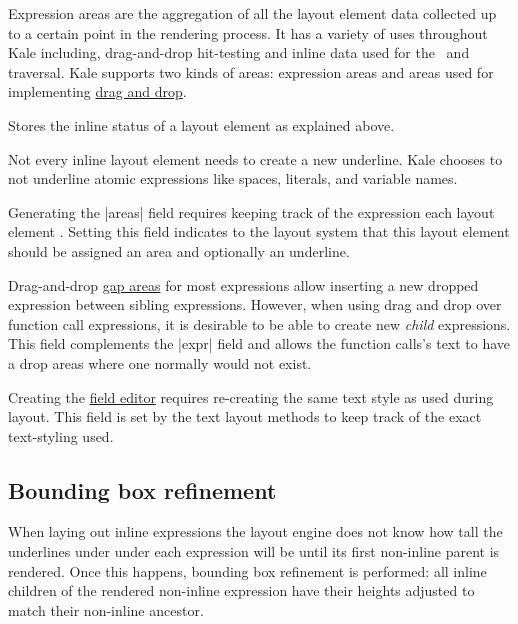  Expression areas are the aggregation of all the layout element
data collected up to a certain point in the rendering process. It has a
variety of uses throughout Kale including, drag-and-drop hit-testing and inline
data used for the~\ak{^} and~ traversal. Kale supports two kinds of
areas: expression areas and  areas used for implementing
\hyperref[impl:dnd]{drag and drop}.

 Stores the inline status of a layout element as explained
above.

 Not every inline layout element needs to create
a new underline. Kale
chooses to not underline atomic expressions like spaces, literals, and variable
names.

 Generating the |areas| field requires keeping track of the
expression each layout element . Setting this field indicates
to the layout system that this layout element should be assigned an area and
optionally an underline.

 Drag-and-drop \hyperref[layout:areas]{gap areas} for most
expressions allow inserting a new dropped expression between sibling
expressions. However, when using drag and drop over function call expressions,
it is desirable to be able to create new \emph{child} expressions. This field
complements the |expr| field and allows the function calls's text to have a
drop areas where one normally would not exist.

 Creating the \hyperref[soln:field_editing]{field editor} requires
re-creating the same text style as used during layout. This field is set by the
text layout methods to keep track of the exact text-styling used.

\subsection{Bounding box refinement}
When laying out inline expressions the layout engine does not know how
tall the underlines under under each expression will be until its first
non-inline parent is rendered. Once this happens, bounding box refinement
is performed: all inline children of the rendered non-inline
expression have their heights adjusted to match their non-inline ancestor.

